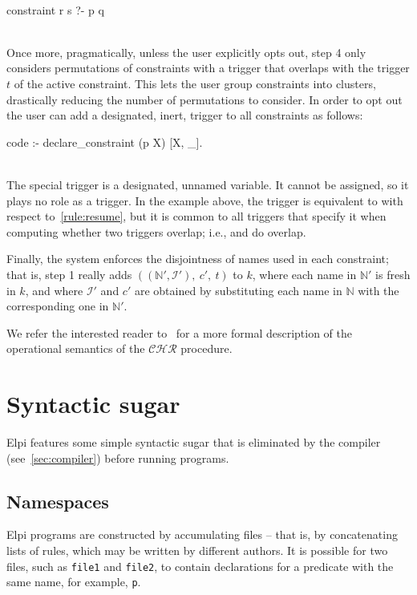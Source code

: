 \documentclass[a4paper, 11pt]{book}
\newenvironment{elpicode}
  {\VerbatimEnvironment~\\\begin{elpibox}\begin{xelpicode}}{\end{xelpicode}
\end{elpibox}\\}
\begin{document}
\begin{elpicode}
constraint r s ?- p q {
}
\end{elpicode}
\noindent
Once more, pragmatically, unless the user explicitly opts out, step 4 only
considers permutations of constraints with a trigger that overlaps with the
trigger $t$ of the active constraint.
This lets the user group constraints into clusters,
drastically reducing the number of permutations
to consider. In order to opt out the user can add a designated, inert,
trigger to all constraints as follows:
\begin{elpicode}
code :- declare_constraint (p X) [X, _].
\end{elpicode}
The special trigger \elpi{_} is a designated, unnamed variable. It cannot be
assigned, so it plays no role as a trigger. In the example above, the trigger
\elpi{[X, _]} is equivalent to \elpi{[X]} with respect to~\ref{rule:resume},
but it is common to all triggers that specify it when computing whether two
triggers overlap; i.e., \elpi{[X, _]} and \elpi{[Y, _]} do overlap.

Finally, the system enforces the disjointness of names used in each constraint;
that is, step 1 really adds $((\mathbb{N'},\mathcal{I'}),\ c',\ t)$ to $k$,
where each name in $\mathbb{N'}$ is fresh in $k$, and where $\mathcal{I'}$ and
$c'$ are obtained by substituting each name in $\mathbb{N}$ with the
corresponding one in $\mathbb{N'}$.

We refer the interested reader to~\cite{TASSI_2019} for a more formal
description of the operational semantics of the $\mathcal{CHR}$ procedure.


\section{Syntactic sugar}


Elpi features some simple syntactic sugar that is eliminated by the compiler (see~\cref{sec:compiler})
before running programs.

\subsection{Namespaces}

Elpi programs are constructed by accumulating files -- that is, by concatenating lists
of rules, which may be written by different authors. It is possible for two
files, such as \texttt{file1} and \texttt{file2}, to contain declarations for a
predicate with the same name, for example, \texttt{p}.
\end{document}
